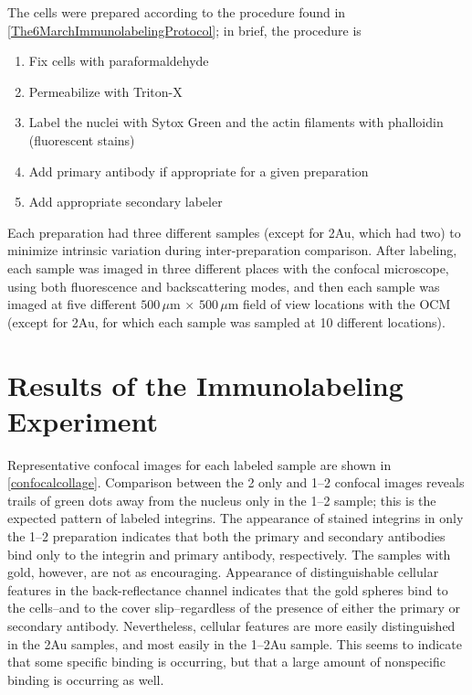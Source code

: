The cells were prepared according to the procedure found in \autoref{The6MarchImmunolabelingProtocol}; in brief, the procedure is

\begin{enumerate}
\item Fix cells with paraformaldehyde

\item Permeabilize with Triton-X

\item Label the nuclei with Sytox Green and the actin filaments with phalloidin (fluorescent stains)

\item Add primary antibody if appropriate for a given preparation

\item Add appropriate secondary labeler

\end{enumerate}

Each preparation had three different samples (except for 2Au, which had two) to minimize intrinsic variation during inter-preparation comparison. After labeling, each sample was imaged in three different places with the confocal microscope, using both fluorescence and backscattering modes, and then each sample was imaged at five different $500\,\mu\mathrm{m}\,\times\,500\,\mu\mathrm{m}$ field of view locations with the OCM (except for 2Au, for which each sample was sampled at 10 different locations).

\section{Results of the Immunolabeling Experiment}
\label{resultsoftheimmunolabelingexperiment}

Representative confocal images for each labeled sample are shown in \autoref{confocalcollage}. Comparison between the 2 only and 1--2 confocal images reveals trails of green dots away from the nucleus only in the 1--2 sample; this is the expected pattern of labeled integrins. The appearance of stained integrins in only the 1--2 preparation indicates that both the primary and secondary antibodies bind only to the integrin and primary antibody, respectively. The samples with gold, however, are not as encouraging. Appearance of distinguishable cellular features in the back-reflectance channel indicates that the gold spheres bind to the cells--and to the cover slip--regardless of the presence of either the primary or secondary antibody. Nevertheless, cellular features are more easily distinguished in the 2Au samples, and most easily in the 1--2Au sample. This seems to indicate that some specific binding is occurring, but that a large amount of nonspecific binding is occurring as well.

